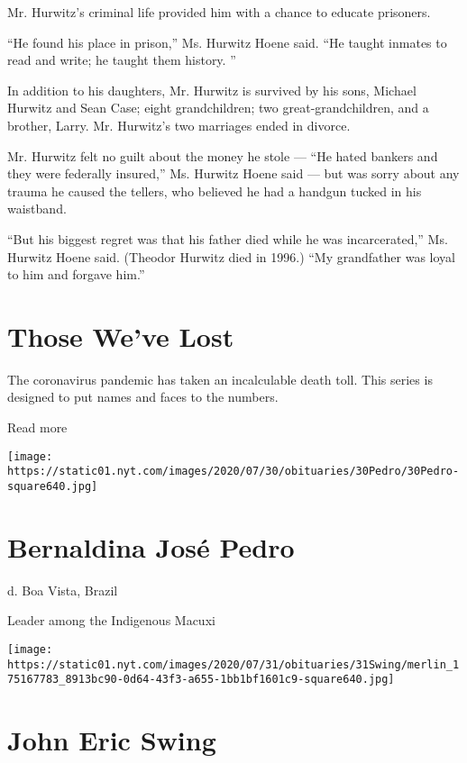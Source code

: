 Mr. Hurwitz's criminal life provided him with a chance to educate
prisoners.

``He found his place in prison,'' Ms. Hurwitz Hoene said. ``He taught
inmates to read and write; he taught them history. ''

In addition to his daughters, Mr. Hurwitz is survived by his sons,
Michael Hurwitz and Sean Case; eight grandchildren; two
great-grandchildren, and a brother, Larry. Mr. Hurwitz's two marriages
ended in divorce.

Mr. Hurwitz felt no guilt about the money he stole --- ``He hated
bankers and they were federally insured,'' Ms. Hurwitz Hoene said ---
but was sorry about any trauma he caused the tellers, who believed he
had a handgun tucked in his waistband.

``But his biggest regret was that his father died while he was
incarcerated,'' Ms. Hurwitz Hoene said. (Theodor Hurwitz died in 1996.)
``My grandfather was loyal to him and forgave him.''

\href{https://www.nytimes.com/interactive/2020/obituaries/people-died-coronavirus-obituaries.html?action=click\&pgtype=Article\&state=default\&region=BELOW_MAIN_CONTENT\&context=covid_obits_promo}{}

\hypertarget{those-weve-lost}{%
\section{Those We've Lost}\label{those-weve-lost}}

The coronavirus pandemic has taken an incalculable death toll. This
series is designed to put names and faces to the numbers.

Read more

\texttt{[image: https://static01.nyt.com/images/2020/07/30/obituaries/30Pedro/30Pedro-square640.jpg]}

\hypertarget{bernaldina-josuxe9-pedro}{%
\section{Bernaldina José Pedro}\label{bernaldina-josuxe9-pedro}}

d. Boa Vista, Brazil

Leader among the Indigenous Macuxi

\texttt{[image: https://static01.nyt.com/images/2020/07/31/obituaries/31Swing/merlin\_175167783\_8913bc90-0d64-43f3-a655-1bb1bf1601c9-square640.jpg]}

\hypertarget{john-eric-swing}{%
\section{John Eric Swing}\label{john-eric-swing}}

